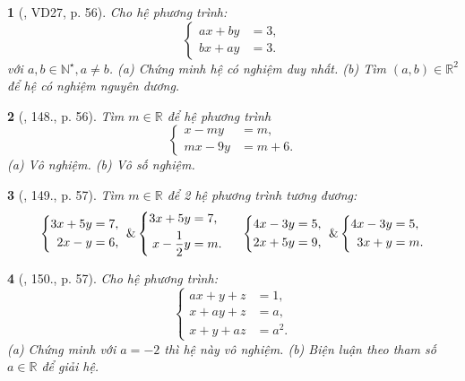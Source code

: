 \documentclass{article}
\newtheorem{baitoan}{}
\begin{document}
\begin{baitoan}[\cite{Tuyen_Toan_9_old}, VD27, p. 56]
	Cho hệ phương trình:
	\begin{equation*}
		\left\{\begin{split}
			ax + by &= 3,\\
			bx + ay &= 3.
		\end{split}\right.
	\end{equation*}
	với $a,b\in\mathbb{N}^\star,a\ne b$. (a) Chứng minh hệ có nghiệm duy nhất. (b) Tìm $(a,b)\in\mathbb{R}^2$ để hệ có nghiệm nguyên dương.
\end{baitoan}

\begin{baitoan}[\cite{Tuyen_Toan_9_old}, 148., p. 56]
	Tìm $m\in\mathbb{R}$ để hệ phương trình
	\begin{equation*}
		\left\{\begin{split}
			x - my &= m,\\
			mx - 9y &= m + 6.
		\end{split}\right.
	\end{equation*}
	(a) Vô nghiệm. (b) Vô số nghiệm.
\end{baitoan}

\begin{baitoan}[\cite{Tuyen_Toan_9_old}, 149., p. 57]
	Tìm $m\in\mathbb{R}$ để 2 hệ phương trình tương đương:
	\begin{equation*}
		\left\{\begin{split}
			3x + 5y &= 7,\\
			2x - y &= 6,
		\end{split}\right.\ \&
		\left\{\begin{split}
			3x + 5y &= 7,\\
			x - \frac{1}{2}y &= m.
		\end{split}\right.\hspace{5mm} \left\{\begin{split}
			4x - 3y &= 5,\\
			2x + 5y &= 9,
		\end{split}\right.\ \&
		\left\{\begin{split}
			4x - 3y &= 5,\\
			3x + y &= m.
		\end{split}\right.
	\end{equation*}
\end{baitoan}

\begin{baitoan}[\cite{Tuyen_Toan_9_old}, 150., p. 57]
	Cho hệ phương trình:
	\begin{equation*}
		\left\{\begin{split}
			ax + y + z &= 1,\\
			x + ay + z &= a,\\
			x + y + az &= a^2.
		\end{split}\right.
	\end{equation*}
	(a) Chứng minh với $a = -2$ thì hệ này vô nghiệm. (b) Biện luận theo tham số $a\in\mathbb{R}$ để giải hệ.
\end{baitoan}
\end{document}
